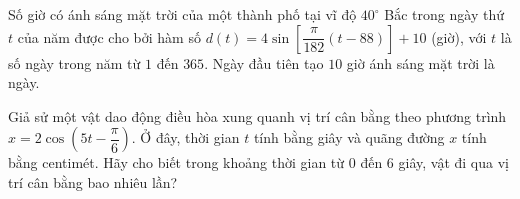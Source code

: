 \begin{bt}%

	Số giờ có ánh sáng mặt trời của một thành phố tại vĩ độ $40^\circ$ Bắc trong ngày thứ $t$ của năm được cho bởi hàm số $d(t) = 4 \sin\left[\dfrac{\pi}{182}(t - 88)\right] + 10$ (giờ), với $t$ là số ngày trong năm từ $1$ đến $365$. Ngày đầu tiên tạo $10$ giờ ánh sáng mặt trời là ngày.
\end{bt}

\begin{bt}%

Giả sử một vật dao động điều hòa xung quanh vị trí cân bằng theo phương trình $x=2\cos\left(5t-\dfrac{\pi}{6} \right)$. Ở đây, thời gian $t$ tính bằng giây và quãng đường $x$ tính bằng centimét. Hãy cho biết trong khoảng thời gian từ $0$ đến $6$ giây, vật đi qua vị trí cân bằng bao nhiêu lần?
\end{bt}

